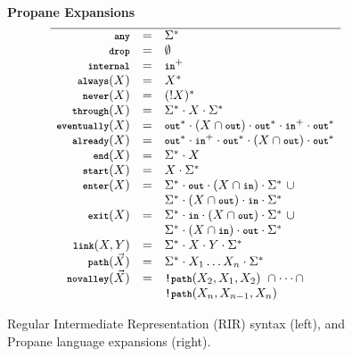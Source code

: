 \documentclass{sig-alternate-10pt}
\newcommand{\KW}[1]{\texttt{\small\bfseries{#1}}}
\newcommand{\Any}{\KW{any}}
\newcommand{\None}{\KW{drop}}
\newcommand{\In}{\KW{in}}
\newcommand{\Out}{\KW{out}}
\newcommand{\NOT}{\texttt{!}}
\newcommand{\Exit}{\KW{exit}}
\newcommand{\End}{\KW{end}}
\newcommand{\Start}{\KW{start}}
\newcommand{\Enter}{\KW{enter}}
\newcommand{\Eventually}{\KW{eventually}}
\newcommand{\Already}{\KW{already}}
\newcommand{\Internal}{\KW{internal}}
\newcommand{\Never}{\KW{never}}
\newcommand{\Always}{\KW{always}}
\newcommand{\Through}{\KW{through}}
\newcommand{\LinkKW}{\KW{link}}
\newcommand{\PathKW}{\KW{path}}
\newcommand{\Novalley}{\KW{novalley}}
\newcommand{\hdr}[2]{\flushleft \chdr{\hspace{5mm}#1}{#2}}
\newcommand{\chdr}[2]{\textbf{#1} {#2} \\ \centering}%
\begin{document}
\begin{figure}[t]
\begin{minipage}[t]{.45\linewidth}
  \end{minipage}
  ~~
  \vrule
  ~~
  \begin{minipage}[t]{.5\linewidth}\small
  \hdr{Propane Expansions}{}
  \vspace*{-1\baselineskip}
  \[\begin{array}{rcl}
    \hline
    \Any               & = & \Sigma^* \\
    \None              & = & \emptyset \\
    \Internal          & = & \In^+ \\
    \Always(X)         & = & X^* \\
    \Never(X)          & = & (!X)^* \\
    \Through(X)        & = & \Sigma^* \cdot X \cdot \Sigma^* \\
    \Eventually(X)     & = & \Out^* \cdot (X \cap \Out) \cdot \Out^* \cdot \In^+ \cdot \Out^* \\
    \Already(X)        & = & \Out^* \cdot \In^+ \cdot \Out^* \cdot (X \cap \Out) \cdot \Out^* \\
    \End(X)            & = & \Sigma^* \cdot X \\
    \Start(X)          & = & X \cdot \Sigma^* \\
    \Enter(X)          & = & \Sigma^* \cdot \Out \cdot (X \cap \In) \cdot \Sigma^* ~ \cup \\
                       &   & \Sigma^* \cdot (X \cap \Out) \cdot \In \cdot \Sigma^* \\
    \Exit(X)           & = & \Sigma^* \cdot \In \cdot (X \cap \Out) \cdot \Sigma^* ~ \cup \\
                       &   & \Sigma^* \cdot (X \cap \In) \cdot \Out \cdot \Sigma^* \\
    \LinkKW(X,Y)       & = & \Sigma^* \cdot X \cdot Y \cdot \Sigma^* \\
    \PathKW(\vec{X})   & = & \Sigma^* \cdot X_1 \dots X_n \cdot \Sigma^* \\
    \Novalley(\vec{X}) & = & \NOT\PathKW(X_2,X_1,X_2) ~ \cap \dots \cap \\
                       &   & \NOT\PathKW(X_n,X_{n-1},X_n) \\
  \end{array} \]%

  \end{minipage}%

  \hrulefill%

  \caption{Regular Intermediate Representation (RIR) syntax (left), and
           Propane language expansions (right).}
  \label{fig:rir-syntax}
\end{figure}%
\end{document}
